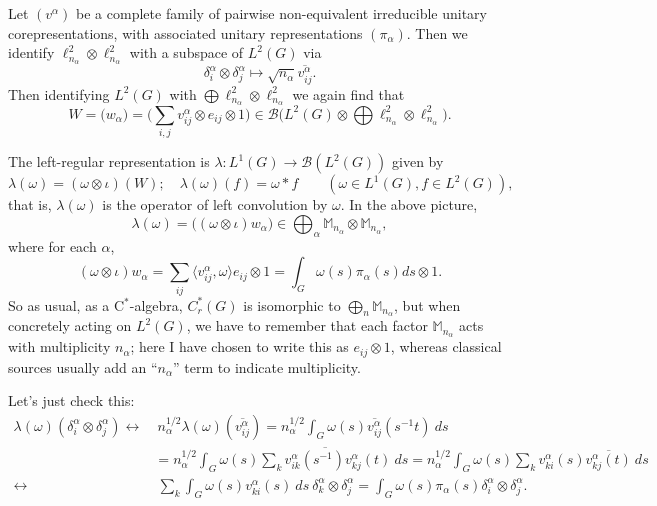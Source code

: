 \documentclass[twoside,a4paper,12pt]{article}
\theoremstyle{plain}
\theoremstyle{definition}
\newcommand{\ip}[2]{\langle #1,#2 \rangle}
\newcommand{\mc}{\mathcal}
\begin{document}
Let $(v^\alpha)$ be a complete family of pairwise non-equivalent irreducible
unitary corepresentations, with associated unitary representations
$(\pi_\alpha)$.  Then we identify $\ell^2_{n_\alpha} \otimes \ell^2_{n_\alpha}$
with a subspace of $L^2(G)$ via
\[ \delta_i^\alpha\otimes\delta_j^\alpha \mapsto \sqrt{n_\alpha}
\overline{ v^\alpha_{ij} }. \]
Then identifying $L^2(G)$ with $\bigoplus \ell^2_{n_\alpha} \otimes
\ell^2_{n_\alpha}$ we again find that
\[ W = \big( w_\alpha \big) = \Big( \sum_{i,j} v^\alpha_{ij} \otimes
e_{ij} \otimes 1 \Big) \in \mc B\Big( L^2(G) \otimes \bigoplus \ell^2_{n_\alpha}
\otimes \ell^2_{n_\alpha} \Big). \]

The left-regular representation is $\lambda:L^1(G)\rightarrow\mc B(L^2(G))$
given by
\[ \lambda(\omega) = (\omega\otimes\iota)(W); \quad
\lambda(\omega)(f) = \omega*f \qquad (\omega\in L^1(G), f\in L^2(G)), \]
that is, $\lambda(\omega)$ is the operator of left convolution by $\omega$.
In the above picture,
\[ \lambda(\omega) = \big( (\omega\otimes\iota)w_\alpha \big) \in \bigoplus_\alpha
\mathbb M_{n_\alpha}\otimes \mathbb M_{n_\alpha}, \]
where for each $\alpha$,
\[ (\omega\otimes\iota)w_\alpha = \sum_{ij} \ip{v^\alpha_{ij}}{\omega} e_{ij}
\otimes 1
= \int_G \omega(s) \pi_\alpha(s) ds \otimes 1. \]
So as usual, as a C$^*$-algebra, $C^*_r(G)$ is isomorphic to
$\bigoplus_n \mathbb M_{n_\alpha}$, but when concretely acting on $L^2(G)$,
we have to remember that each factor $\mathbb M_{n_\alpha}$ acts with
multiplicity $n_\alpha$; here I have chosen to write this as $e_{ij}\otimes 1$,
whereas classical sources usually add an ``$n_\alpha$'' term to indicate
multiplicity.

Let's just check this:
\begin{align*}
\lambda(\omega)(\delta^\alpha_i\otimes\delta^\alpha_j)
\leftrightarrow &\ n_\alpha^{1/2} \lambda(\omega)(\overline{v^\alpha_{ij}})
= n_\alpha^{1/2} \int_G \omega(s) \overline{v^\alpha_{ij}}(s^{-1}t) \ ds \\
&= n_\alpha^{1/2} \int_G \omega(s) \overline{
  \sum_k v^\alpha_{ik}(s^{-1}) v^\alpha_{kj}(t) } \ ds
= n_\alpha^{1/2} \int_G \omega(s) \sum_k v^\alpha_{ki}(s)
  \overline{ v^\alpha_{kj}(t) } \ ds \\
\leftrightarrow &\ \sum_k \int_G \omega(s) v^\alpha_{ki}(s) \ ds \
  \delta^\alpha_k \otimes \delta^\alpha_j
= \int_G \omega(s) \pi_\alpha(s)\delta^\alpha_i \otimes \delta^\alpha_j.
\end{align*}
\end{document}
